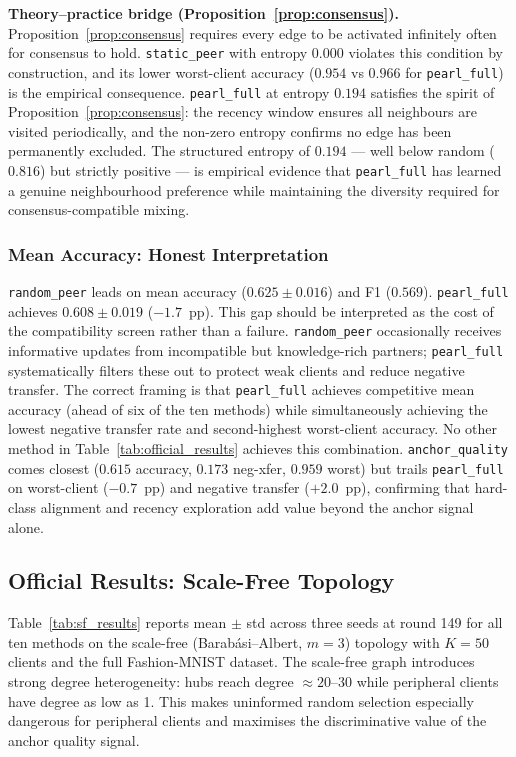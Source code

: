 \documentclass[conference]{IEEEtran}
\begin{document}
\textbf{Theory--practice bridge (Proposition~\ref{prop:consensus}).}
Proposition~\ref{prop:consensus} requires every edge to be activated infinitely often for consensus to hold. \texttt{static\_peer} with entropy $0.000$ violates this condition by construction, and its lower worst-client accuracy ($0.954$ vs $0.966$ for \texttt{pearl\_full}) is the empirical consequence. \texttt{pearl\_full} at entropy $0.194$ satisfies the spirit of Proposition~\ref{prop:consensus}: the recency window ensures all neighbours are visited periodically, and the non-zero entropy confirms no edge has been permanently excluded. The structured entropy of $0.194$ --- well below random ($0.816$) but strictly positive --- is empirical evidence that \texttt{pearl\_full} has learned a genuine neighbourhood preference while maintaining the diversity required for consensus-compatible mixing.

\subsubsection{Mean Accuracy: Honest Interpretation}
\label{subsubsec:official-mean-acc}

\texttt{random\_peer} leads on mean accuracy ($0.625\pm0.016$) and F1 ($0.569$). \texttt{pearl\_full} achieves $0.608\pm0.019$ ($-1.7$~pp). This gap should be interpreted as the cost of the compatibility screen rather than a failure. \texttt{random\_peer} occasionally receives informative updates from incompatible but knowledge-rich partners; \texttt{pearl\_full} systematically filters these out to protect weak clients and reduce negative transfer. The correct framing is that \texttt{pearl\_full} achieves competitive mean accuracy (ahead of six of the ten methods) while simultaneously achieving the lowest negative transfer rate and second-highest worst-client accuracy. No other method in Table~\ref{tab:official_results} achieves this combination. \texttt{anchor\_quality} comes closest ($0.615$ accuracy, $0.173$ neg-xfer, $0.959$ worst) but trails \texttt{pearl\_full} on worst-client ($-0.7$~pp) and negative transfer ($+2.0$~pp), confirming that hard-class alignment and recency exploration add value beyond the anchor signal alone.

\subsection{Official Results: Scale-Free Topology}
\label{subsec:results-sf}

Table~\ref{tab:sf_results} reports mean $\pm$ std across three seeds at round 149 for all ten methods on the scale-free (Barab\'{a}si--Albert, $m=3$) topology with $K=50$ clients and the full Fashion-MNIST dataset. The scale-free graph introduces strong degree heterogeneity: hubs reach degree $\approx20$--30 while peripheral clients have degree as low as 1. This makes uninformed random selection especially dangerous for peripheral clients and maximises the discriminative value of the anchor quality signal.
\end{document}
